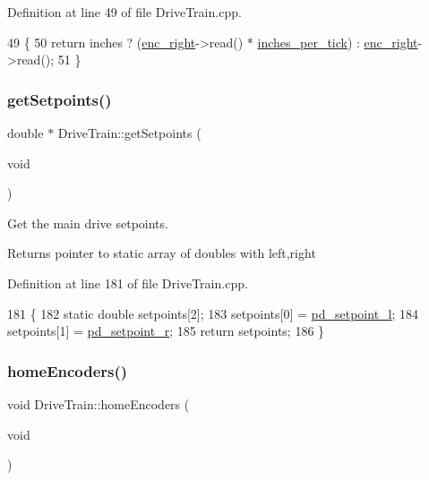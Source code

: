 Definition at line 49 of file Drive\+Train.\+cpp.


\begin{DoxyCode}
49                                                      \{
50     \textcolor{keywordflow}{return} inches ? (\hyperlink{class_drive_train_aea08b3ba330e27f19b5658446e7cf51a}{enc\_right}->read() * \hyperlink{class_drive_train_adc3896c625d516e91add67eedb525440}{inches\_per\_tick}) : 
      \hyperlink{class_drive_train_aea08b3ba330e27f19b5658446e7cf51a}{enc\_right}->read();
51 \}
\end{DoxyCode}
\mbox{\label{class_drive_train_a70eeb8cff983fd609f29734bde4751f2}} 
\subsubsection{\texorpdfstring{get\+Setpoints()}{getSetpoints()}}
{\footnotesize\ttfamily double $\ast$ Drive\+Train\+::get\+Setpoints (\begin{DoxyParamCaption}\item[{void}]{ }\end{DoxyParamCaption})}



Get the main drive setpoints. 

\begin{DoxyReturn}{Returns}
pointer to static array of doubles with left,right 
\end{DoxyReturn}


Definition at line 181 of file Drive\+Train.\+cpp.


\begin{DoxyCode}
181                                      \{
182     \textcolor{keyword}{static} \textcolor{keywordtype}{double} setpoints[2];
183     setpoints[0] = \hyperlink{class_drive_train_a44be549ca050bf41e9b2474a2640200b}{pd\_setpoint\_l};
184     setpoints[1] = \hyperlink{class_drive_train_a57e389649151326bf84ab4bd13b6b61c}{pd\_setpoint\_r};
185     \textcolor{keywordflow}{return} setpoints;
186 \}
\end{DoxyCode}
\mbox{\label{class_drive_train_a8cd4f236ac30b716df23971dad5d1a0a}} 
\subsubsection{\texorpdfstring{home\+Encoders()}{homeEncoders()}}
{\footnotesize\ttfamily void Drive\+Train\+::home\+Encoders (\begin{DoxyParamCaption}\item[{void}]{ }\end{DoxyParamCaption})}



